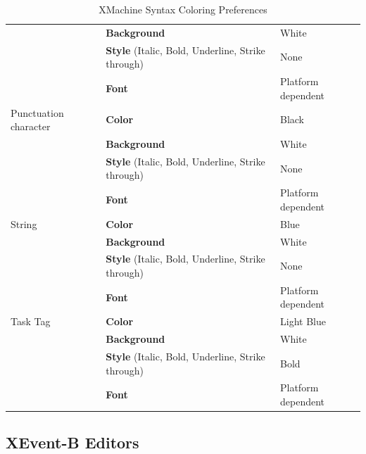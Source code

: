 \begin{table}[!htbp]
\begin{tabular}{|p{}|p{}|p{}|}
                                         & \textbf{Background} & White \\
                                         & \textbf{Style} (Italic, Bold, Underline, Strike through) & None \\
                                         & \textbf{Font} & Platform dependent \\
    \hline
    Punctuation character & \textbf{Color} & Black \\
                                         & \textbf{Background} & White \\
                                         & \textbf{Style} (Italic, Bold, Underline, Strike through) & None \\
                                         & \textbf{Font} & Platform dependent \\
    \hline
    String & \textbf{Color} & Blue \\
                                         & \textbf{Background} & White \\
                                         & \textbf{Style} (Italic, Bold, Underline, Strike through) & None \\
                                         & \textbf{Font} & Platform dependent \\
    \hline
    Task Tag & \textbf{Color} & Light Blue \\
                                         & \textbf{Background} & White \\
                                         & \textbf{Style} (Italic, Bold, Underline, Strike through) & Bold \\
                                         & \textbf{Font} & Platform dependent \\
    \hline
  \end{tabular}
  \caption{XMachine Syntax Coloring Preferences}
  \label{tab:xmachine-syntax-coloring-preference}
\end{table}

\subsection{XEvent-B Editors}
\label{sec:xevent-b-editors}


